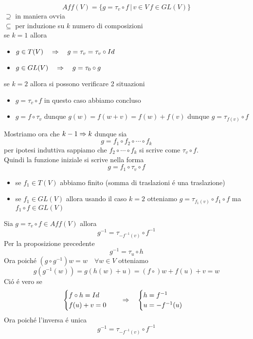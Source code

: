 \begin{prop}\label{Affinecara}
$$ Aff(V)= \{ g = \tau_v \circ f \, \vert \, v \in V \, f \in GL(V) \}$$
\proof $\supseteq $ in maniera ovvia \\
$\subseteq $ per induzione su $k$ numero di composizioni\\
se $k=1 $ allora 
\begin{itemize}
\item $g\in T(V) \quad \Rightarrow \quad g= \tau_v = \tau_v \circ Id $
\item $g\in GL(V) \quad \Rightarrow \quad g=\tau_0 \circ g $
\end{itemize} 
se $k=2 $ allora si possono verificare 2 situazioni
\begin{itemize}
\item $g= \tau_v \circ f $ in questo caso abbiamo concluso
\item $g = f \circ \tau_v $ dunque $g(w) = f(w+v)=f(w)+f(v) $ dunque $g=\tau_{f(v)} \circ f $
\end{itemize}
Mostriamo ora che $k-1 \Rightarrow k $ dunque sia 
$$ g = f_1 \circ f_2 \circ \cdots \circ f_k $$ 
per ipotesi induttiva sappiamo che $f_2 \circ \cdots \circ f_k $ si scrive come $\tau_v \circ f $.\\
Quindi la funzione iniziale si scrive nella forma
$$ g= f_1 \circ \tau_v \circ f $$
\begin{itemize}
\item se $f_1 \in T(V) $ abbiamo finito (somma di traslazioni \'e una traslazione)
\item se $f_1 \in GL(V) $ allora usando il caso $k=2$ otteniamo 
$g= \tau_{f_1(v)} \circ f_1 \circ f $ ma $f_1 \circ f \in GL(V)$
\end{itemize}
\endproof
\end{prop}
\newpage
\begin{lem}\bianco
Sia $g= \tau_v \circ f \in Aff(V)$ allora
$$ g^{-1}= \tau_{-f^{-1}(v)}\circ f^{-1} $$
\proof
Per la proposizione precedente 
$$g^{-1}=\tau_u \circ h $$
Ora poich\'e $\left( g \circ g^{-1}\right) w = w \quad \forall w \in V $ otteniamo
$$ g \left( g^{-1}(w) \right) = g\left( h(w)+u \right)= ( f \circ )w +f(u)+v=w$$
Ci\'o \'e vero se 
$$ \begin{cases} f\circ h = Id \\
f(u)+v =0
\end{cases} \quad \Rightarrow \quad \begin{cases} h=f^{-1} 
\\u = -f^{-1}(u) \end{cases}$$
Ora poich\'e l'inversa \'e unica 
$$ g^{-1}= \tau_{-f^{-1}(v) }\circ f^{-1}$$
\endproof
\end{lem}

